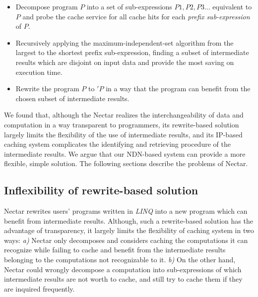 \documentclass[journal]{IEEEtran}
\begin{document}
\begin{itemize} 

\item Decompose program $P$ into a set of sub-expressions ${P1, P2, P3 ...}$
equivalent to $P$ and probe the cache service for all cache hits for each
\emph{prefix sub-expression} of $P$.

\item Recursively applying the maximum-independent-set algorithm from the
largest to the shortest prefix sub-expression, finding a subset of intermediate
results which are disjoint on input data and provide the most saving on
execution time.


\item Rewrite the program $P$ to $'P$ in a way that the program can benefit
from the chosen subset of intermediate results. 

\end{itemize}

We found that, although the Nectar realizes the interchangeability of data and
computation in a way transparent to programmers, its rewrite-based solution
largely limits the flexibility of the use of intermediate results, and its
IP-based caching system complicates the identifying and retrieving procedure of
the intermediate results.  We argue that our NDN-based system can provide a
more flexible, simple solution.  The following sections describe the problems
of Nectar.

\subsection{Inflexibility of rewrite-based solution} Nectar rewrites users'
programs written in \emph{LINQ} into a new program which can benefit from
intermediate results. Although, such a rewrite-based solution has the advantage
of transparency, it largely limits the flexibility of caching system in two
ways: \emph{a)} Nectar only decomposes and considers caching the computations
it can recognize while failing to cache and benefit from the intermediate
results belonging to the computations not recognizable to it.  \emph{b)} On the
other hand, Nectar could wrongly decompose a computation into sub-expressions
of which intermediate results are not worth to cache, and still try to cache
them if they are inquired frequently.
\end{document}
